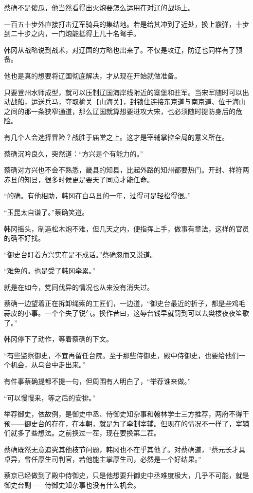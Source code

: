 蔡确不是傻瓜，他当然看得出火炮要怎么运用在对辽的战场上。

一百五十步外直接打击辽军骑兵的集结地。若是给其冲到了近处，换上霰弹，十步到二十步之内，一门炮能抵得上几十名弩手。

韩冈从战略说到战术，对辽国的方略也出来了。不仅是攻辽，防辽也同样有了预备。

他也是真的想要将辽国彻底解决，才从现在开始就做准备。

只要登州水师成型，就可以压制辽国海岸线附近的寨堡和驻军。当宋军随时可以出动战船，运送兵马，夺取榆关【山海关】，封锁住连接东京道与南京道、位于海山之间的那一条狭窄通道，那么辽国就算想要进攻大宋，也必须随时提防身后的危险。

有几个人会选择冒险？战胜于庙堂之上。这才是宰辅掌控全局的意义所在。

蔡确沉吟良久，突然道：“方兴是个有能力的。”

蔡确对方兴也不会不熟悉，畿县的知县，比起外路的知州都要热门。开封、祥符两赤县的知县，很多时候更是要天子同意才能任命。

“的确。有他相助，韩冈在白马县的一年，过得可是轻松得很。”

“玉昆太自谦了。”蔡确笑道。

韩冈摇头，制造松木炮不难，但几天之内，便指挥上手，做事有章法，这样的官员的确不好找。

“御史台盯着方兴实在是不成话。”蔡确忽而又说道。

“难免的。也是受了韩冈牵累。”

就是在如今，党同伐异的情况也从来没有消失过。

蔡确一边望着正在拆卸绳索的工匠们，一边道，“御史台最近的折子，都是些鸡毛蒜皮的小事。一个个失了锐气。换作昔曰，这辱台钱早就罚到可以去樊楼夜夜笙歌了。”

韩冈停下了动作，等着蔡确的下文。

“有些监察御史，不宜再留任台院。至于那些侍御史，殿中侍御史，也要给他们一个机会，从乌台中走出来。”

有件事蔡确提都不提一句，但周围有人明白了，“举荐谁来做。”

“可以慢慢来，等之后的安排。”

举荐御史，依故例，是御史中丞、侍御史知杂事和翰林学士三方推荐，两府不得干预——御史台的存在，在本朝，就是为了牵制宰辅。但现在的情况不一样了，宰辅们就多了些想法。之前换过一茬，现在要换第二茬。

蔡确既然无意追究其他枝节问题，韩冈也不在乎其他了。对蔡确道，“蔡元长才具卓异，曾任厚生司判官，若他能主掌厚生司，必然是一个好结果。”

蔡京已经做到了殿中侍御史，只是他想要升御史中丞难度极大，几乎不可能，就是御史台副——侍御史知杂事也没有什么机会。

